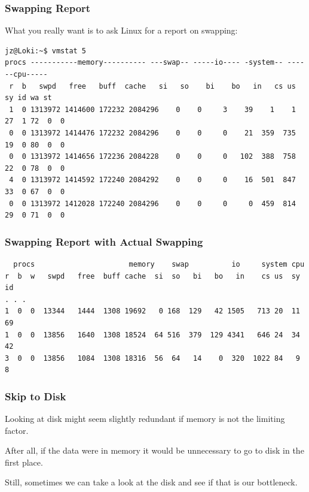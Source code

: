 \begin{frame}[fragile]
\frametitle{Swapping Report}

What you really want is to ask Linux for a report on swapping:

{\scriptsize
\begin{verbatim}
jz@Loki:~$ vmstat 5
procs -----------memory---------- ---swap-- -----io---- -system-- ------cpu-----
 r  b   swpd   free   buff  cache   si   so    bi    bo   in   cs us sy id wa st
 1  0 1313972 1414600 172232 2084296    0    0     3    39    1    1 27  1 72  0  0
 0  0 1313972 1414476 172232 2084296    0    0     0    21  359  735 19  0 80  0  0
 0  0 1313972 1414656 172236 2084228    0    0     0   102  388  758 22  0 78  0  0
 4  0 1313972 1414592 172240 2084292    0    0     0    16  501  847 33  0 67  0  0
 0  0 1313972 1412028 172240 2084296    0    0     0     0  459  814 29  0 71  0  0
\end{verbatim}
}

\end{frame}



\begin{frame}[fragile]
\frametitle{Swapping Report with Actual Swapping}

{\scriptsize
\begin{verbatim}
  procs                      memory    swap          io     system cpu
r  b  w   swpd   free  buff cache  si  so   bi   bo   in    cs us  sy  id
. . .
1  0  0  13344   1444  1308 19692   0 168  129   42 1505   713 20  11  69
1  0  0  13856   1640  1308 18524  64 516  379  129 4341   646 24  34  42
3  0  0  13856   1084  1308 18316  56  64   14    0  320  1022 84   9   8
\end{verbatim}
}

\end{frame}



\begin{frame}
\frametitle{Skip to Disk}

Looking at disk might seem slightly redundant if memory is not the limiting factor. 

After all, if the data were in memory it would be unnecessary to go to disk in the first place. 

Still, sometimes we can take a look at the disk and see if that is our bottleneck.


\end{frame}




